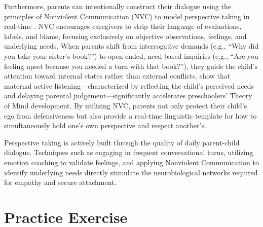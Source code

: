 Furthermore, parents can intentionally construct their dialogue using the principles of Nonviolent Communication (NVC) to model perspective taking in real-time \citep{rosenberg2003}.
NVC encourages caregivers to strip their language of evaluations, labels, and blame, focusing exclusively on objective observations, feelings, and underlying needs.
When parents shift from interrogative demands (e.g., ``Why did you take your sister's book?'') to open-ended, need-based inquiries (e.g., ``Are you feeling upset because you needed a turn with that book?''), they guide the child's attention toward internal states rather than external conflicts.
\citet{nelson2025} show that maternal active listening---characterized by reflecting the child's perceived needs and delaying parental judgement---significantly accelerates preschoolers' Theory of Mind development.
By utilizing NVC, parents not only protect their child's ego from defensiveness but also provide a real-time linguistic template for how to simultaneously hold one's own perspective and respect another's.

\begin{keyinsight}
Perspective taking is actively built through the quality of daily parent-child dialogue.
Techniques such as engaging in frequent conversational turns, utilizing emotion coaching to validate feelings, and applying Nonviolent Communication to identify underlying needs directly stimulate the neurobiological networks required for empathy and secure attachment.
\end{keyinsight}

\newpage
\section{Practice Exercise}

